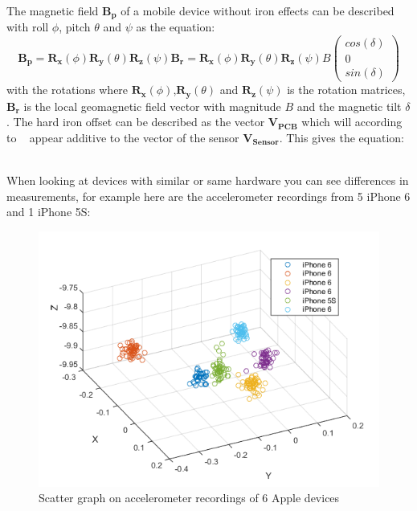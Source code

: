 The magnetic field $\boldsymbol{B_p}$ of a mobile device without iron effects can be described with roll $\phi$, pitch $\theta$ and $\psi$ as the equation:
\begin{equation} \label{eq:magnField}
  \boldsymbol{B_p} = 
  \boldsymbol{R_x}(\phi)\boldsymbol{R_y}(\theta)\boldsymbol{R_z}(\psi)\boldsymbol{B_r} = 
  \boldsymbol{R_x}(\phi)\boldsymbol{R_y}(\theta)\boldsymbol{R_z}(\psi)B\begin{pmatrix}cos(\delta) \\ 0  \\ sin(\delta)\end{pmatrix}
\end{equation}
with the rotations where $ \boldsymbol{R_x}(\phi)$,$\boldsymbol{R_y}(\theta)$ and $\boldsymbol{R_z}(\psi)$ is the rotation matrices, $\boldsymbol{B_r}$ is the local geomagnetic field vector with magnitude $B$ and the magnetic tilt $\delta$. The hard iron offset can be described as the vector $\boldsymbol{V_{PCB}}$ which will according to ~\cite{sensor:magnIron} appear additive to the vector of the sensor $\boldsymbol{V_{Sensor}}$. This gives the equation:
\begin{equation}
\end{equation}
~\cite[]{sensor:magnIron}

  When looking at devices with similar or same hardware you can see differences in measurements, for example here are the accelerometer recordings from 5 iPhone 6 and 1 iPhone 5S:
\begin{figure}[H]
\centering
\includegraphics[scale=.6]{img/scatteriPhone}
\caption{Scatter graph on accelerometer recordings of 6 Apple devices}
\label{fig:digraph}
\end{figure}


